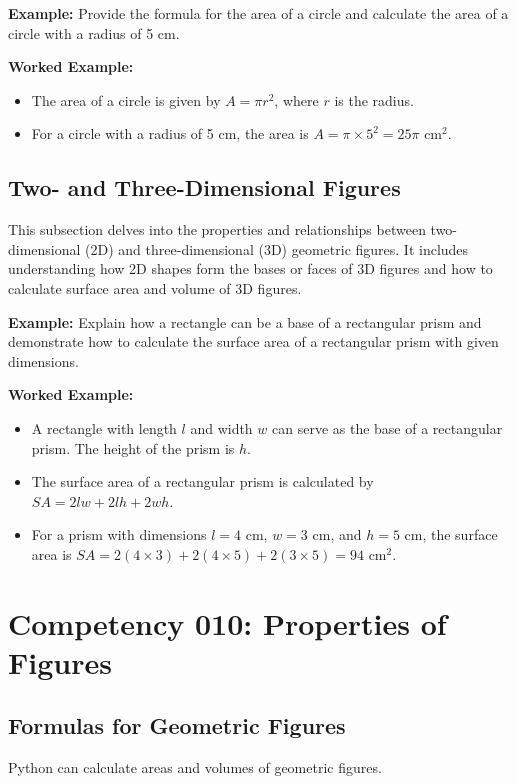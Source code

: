 \documentclass{book}
\begin{document}
\textbf{Example:} Provide the formula for the area of a circle and calculate the area of a circle with a radius of 5 cm.


\textbf{Worked Example:}
\begin{itemize}
        \item The area of a circle is given by \( A = \pi r^2 \), where \( r \) is the radius.
        \item For a circle with a radius of 5 cm, the area is \( A = \pi \times 5^2 = 25\pi \) cm\(^2\).
\end{itemize}


\subsection{Two- and Three-Dimensional Figures}
This subsection delves into the properties and relationships between two-dimensional (2D) and three-dimensional (3D) geometric figures. It includes understanding how 2D shapes form the bases or faces of 3D figures and how to calculate surface area and volume of 3D figures.


\textbf{Example:} Explain how a rectangle can be a base of a rectangular prism and demonstrate how to calculate the surface area of a rectangular prism with given dimensions.


\textbf{Worked Example:}
\begin{itemize}
        \item A rectangle with length \( l \) and width \( w \) can serve as the base of a rectangular prism. The height of the prism is \( h \).
        \item The surface area of a rectangular prism is calculated by \( SA = 2lw + 2lh + 2wh \).
        \item For a prism with dimensions \( l = 4 \) cm, \( w = 3 \) cm, and \( h = 5 \) cm, the surface area is \( SA = 2(4 \times 3) + 2(4 \times 5) + 2(3 \times 5) = 94 \) cm\(^2\).
\end{itemize}



\section{Competency 010: Properties of Figures}
\subsection{Formulas for Geometric Figures}
Python can calculate areas and volumes of geometric figures.
\end{document}
